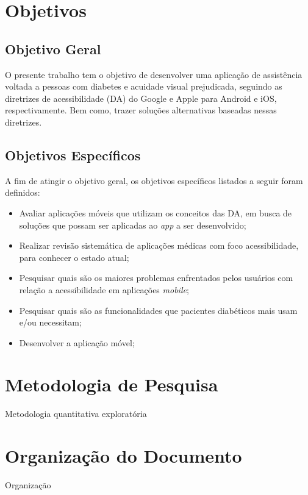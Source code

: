 \section{Objetivos}

\subsection{Objetivo Geral}

O presente trabalho tem o objetivo de desenvolver uma aplicação de assistência voltada a pessoas com diabetes e acuidade visual prejudicada, seguindo as diretrizes de acessibilidade (DA) do Google e Apple para Android e iOS, respectivamente. Bem como, trazer soluções alternativas baseadas nessas diretrizes.

\subsection{Objetivos Específicos}

A fim de atingir o objetivo geral, os objetivos específicos listados a seguir foram definidos:
\begin{itemize}
    \item Avaliar aplicações móveis que utilizam os conceitos das DA, em busca de soluções que possam ser aplicadas ao \textit{app} a ser desenvolvido;
    \item Realizar revisão sistemática de aplicações médicas com foco acessibilidade, para conhecer o estado atual;
    \item Pesquisar quais são os maiores problemas enfrentados pelos usuários com relação a acessibilidade em aplicações \textit{mobile};
    \item Pesquisar quais são as funcionalidades que pacientes diabéticos mais usam e/ou necessitam;
    \item Desenvolver a aplicação móvel;
\end{itemize}

\section{Metodologia de Pesquisa}

Metodologia quantitativa exploratória


\section{Organização do Documento}

Organização

